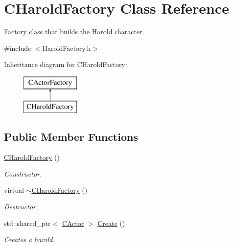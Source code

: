 \hypertarget{class_c_harold_factory}{\section{C\+Harold\+Factory Class Reference}
\label{class_c_harold_factory}
}


Factory class that builds the Harold character.  




{\ttfamily \#include $<$Harold\+Factory.\+h$>$}

Inheritance diagram for C\+Harold\+Factory\+:\begin{figure}[H]
\begin{center}
\leavevmode
\includegraphics[height=2.000000cm]{class_c_harold_factory}
\end{center}
\end{figure}
\subsection*{Public Member Functions}
\begin{DoxyCompactItemize}
\item 
\hypertarget{class_c_harold_factory_aaa726993be5c432dac2ef22bb06a0bba}{\hyperlink{class_c_harold_factory_aaa726993be5c432dac2ef22bb06a0bba}{C\+Harold\+Factory} ()}\label{class_c_harold_factory_aaa726993be5c432dac2ef22bb06a0bba}

\begin{DoxyCompactList}\small\item\em Constructor. \end{DoxyCompactList}\item 
\hypertarget{class_c_harold_factory_aa2518771a064994af61c159d43788a3b}{virtual \hyperlink{class_c_harold_factory_aa2518771a064994af61c159d43788a3b}{$\sim$\+C\+Harold\+Factory} ()}\label{class_c_harold_factory_aa2518771a064994af61c159d43788a3b}

\begin{DoxyCompactList}\small\item\em Destructor. \end{DoxyCompactList}\item 
std\+::shared\+\_\+ptr$<$ \hyperlink{class_c_actor}{C\+Actor} $>$ \hyperlink{class_c_harold_factory_a785f8194f83d866bfc2a237fc3d4abc1}{Create} ()
\begin{DoxyCompactList}\small\item\em Creates a harold. \end{DoxyCompactList}\end{DoxyCompactItemize}


